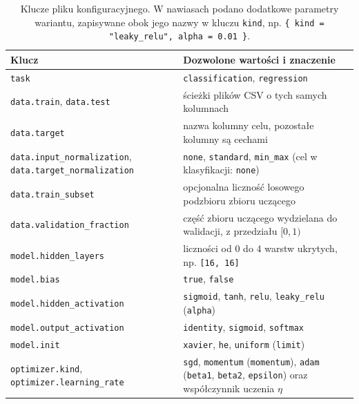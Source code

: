 \begin{code}
    
    \caption{Plik \texttt{config.toml} eksperymentu pokazowego \texttt{showcase-three-gauss}.}
    \label{lst:config}
\end{code}

\begin{table}[H]
    \centering
    \small
    \caption{Klucze pliku konfiguracyjnego. W nawiasach podano dodatkowe parametry wariantu, zapisywane obok jego nazwy w kluczu \texttt{kind}, np. \texttt{\{ kind = "leaky\_relu", alpha = 0.01 \}}.}
    \label{tab:config-keys}
    \begin{tabularx}{\textwidth}{>{\raggedright\arraybackslash}p{}X}
        \toprule
        Klucz & Dozwolone wartości i znaczenie \\
        \midrule
        \texttt{task} & \texttt{classification}, \texttt{regression} \\
        \texttt{data.train}, \texttt{data.test} & ścieżki plików CSV o tych samych kolumnach \\
        \texttt{data.target} & nazwa kolumny celu, pozostałe kolumny są cechami \\
        \texttt{data.input\_normalization}, \texttt{data.target\_normalization} & \texttt{none}, \texttt{standard}, \texttt{min\_max} (cel w klasyfikacji: \texttt{none}) \\
        \texttt{data.train\_subset} & opcjonalna liczność losowego podzbioru zbioru uczącego \\
        \texttt{data.validation\_fraction} & część zbioru uczącego wydzielana do walidacji, z przedziału $[0, 1)$ \\
        \texttt{model.hidden\_layers} & liczności od $0$ do $4$ warstw ukrytych, np. \texttt{[16, 16]} \\
        \texttt{model.bias} & \texttt{true}, \texttt{false} \\
        \texttt{model.hidden\_activation} & \texttt{sigmoid}, \texttt{tanh}, \texttt{relu}, \texttt{leaky\_relu} (\texttt{alpha}) \\
        \texttt{model.output\_activation} & \texttt{identity}, \texttt{sigmoid}, \texttt{softmax} \\
        \texttt{model.init} & \texttt{xavier}, \texttt{he}, \texttt{uniform} (\texttt{limit}) \\
        \texttt{optimizer.kind}, \texttt{optimizer.learning\_rate} & \texttt{sgd}, \texttt{momentum} (\texttt{momentum}), \texttt{adam} (\texttt{beta1}, \texttt{beta2}, \texttt{epsilon}) oraz współczynnik uczenia $\eta$ \\

\end{tabularx}
\end{table}
